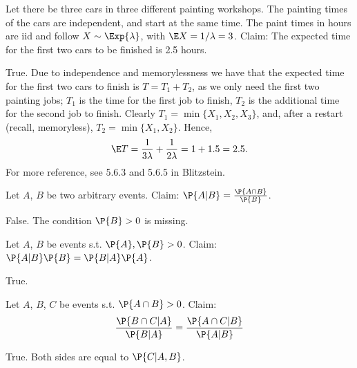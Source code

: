 \documentclass[tf-tutorial-all.tex]{subfiles}
\begin{document}
\begin{truefalse}
Let there be three cars in three different painting workshops.
The painting times of the cars are independent, and start at the same time.
The paint times in hours are iid and follow $X\sim \Exp{\lambda}$, with $\E X = 1/ \lambda = 3$.
Claim: The expected time for the first two cars to be finished is 2.5 hours.

\begin{solution}
True.
Due to independence and memorylessness we have that the expected time for the first two cars to finish is $ T = T_{1} + T_{2}$, as we only need the first two painting jobs;
$T_{1}$ is the time for the first job to finish, $T_{2}$ is the additional time for the second job to finish.
Clearly $T_{1} = \min\{X_{1}, X_{2}, X_{3}\}$,  and, after a restart (recall, memoryless), $T_{2} = \min\{X_{1}, X_{2}\}$. Hence,
\begin{equation*}
\E T = \frac{1}{3 \lambda} + \frac{1}{2\lambda} = 1 + 1.5 = 2.5.
\end{equation*}
For more reference, see 5.6.3 and 5.6.5 in Blitzstein.
\end{solution}
\end{truefalse}



\begin{truefalse}
Let $A$, $B$ be two arbitrary events. Claim: $\P{A|B}=\frac{\P{A \cap B}}{\P{B}}$.
\begin{solution}
False. The condition $\P{B}>0$ is missing.
\end{solution}
\end{truefalse}





\begin{truefalse}
Let $A$, $B$ be events s.t. $\P{A},\P{B}>0$. Claim: $\P{A|B}\P{B}=\P{B|A}\P{A}$.
\begin{solution}
True.
\end{solution}
\end{truefalse}



\begin{truefalse}
Let $A$, $B$, $C$ be events s.t. $\P{A \cap B}>0$. Claim:
\begin{equation}
\frac{\P{B \cap C | A}}{\P{B|A}}=\frac{\P{A \cap C|B}}{\P{A|B}}
\end{equation}
\begin{solution}
True. Both sides are equal to $\P{C|A,B}$.
\end{solution}
\end{truefalse}
\end{document}
